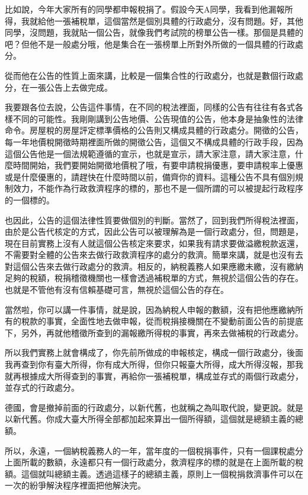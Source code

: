 \documentclass[]{ctexbook}
\begin{document}
比如說，今年大家所有的同學都申報稅捐了。假設今天A同學，我看到他漏報所得，我就給他一張補稅單，這個當然是個別具體的行政處分，沒有問題。好，其他同學，沒問題，我就貼一個公告，就像我們考試院的榜單公告一樣。那個是具體的吧？但他不是一般處分哦，他是集合在一張榜單上所對外所做的一個具體的行政處分。

從而他在公告的性質上面來講，比較是一個集合性的行政處分，也就是數個行政處分，在一張公告上去做完成。

我要跟各位去說，公告這件事情，在不同的稅法裡面，同樣的公告有往往有各式各樣不同的可能性。我剛剛講到公告地價、公告現值的公告，他本身是抽象性的法律命令。房屋稅的房屋評定標準價格的公告則又構成具體的行政處分。開徵的公告，每一年地價稅開徵時期裡面所做的開徵公告，這個又不構成具體的行政手段，因為這個公告他是一個法規範遵循的宣示，也就是宣示，請大家注意，請大家注意，什麼時間開始，我們要開始開徵地價稅了哦，有要申請稅捐優惠，要申請稅率上優惠或是什麼優惠的，請趕快在什麼時間以前，備齊你的資料。這種公告不具有個別規制效力，不能作為行政救濟程序的標的，那也不是一個所謂的可以被提起行政程序的一個標的。

也因此，公告的這個法律性質要做個別的判斷。當然了，回到我們所得稅法裡面，由於是公告代核定的方式，因此公告可以被理解為是一個行政處分，但，問題是，現在目前實務上沒有人就這個公告核定來要求，如果我有請求要做溢繳稅款返還，不需要對全體的公告來去做行政救濟程序的處分的救濟。簡單來講，就是也沒有去對這個公告來去做行政處分的救濟。相反的，納稅義務人如果應繳未繳，沒有繳納足夠的稅額，稅捐稽徵機關也一樣會透過補稅單的方式，無視於這個公告的存在。也就是不管他有沒有信賴基礎可言，無視於這個公告的存在。

當然啦，你可以講一件事情，就是說，因為納稅人申報的數額，沒有把他應繳納所有的稅款的事實，全面性地去做申報，從而稅捐接機關在不變動前面公告的前提底下，另外，再就他稽徵所查到的漏報繳所得稅的事實，再來去做補稅的行政處分。

所以我們實務上就會構成了，你先前所做成的申報核定，構成一個行政處分，後面我再查到你有臺大所得，你有成大所得，但你只報臺大所得，成大所得沒報，那我就再根據成大所得查到的事實，再給你一張補稅單，構成並存式的兩個行政處分，並存式的行政處分。

德國，會是撤掉前面的行政處分，以新代舊，也就稱之為叫取代說，變更說。就是以新代舊。你成大臺大所得全部都加起來算出一個所得額，這個就是總額主義的總額。

所以，永遠，一個納稅義務人的一年，當年度的一個稅捐事件，只有一個課稅處分上面所載的數額，永遠都只有一個行政處分，救濟程序的標的就是在上面所載的稅額。這個就叫總額主義。透過這樣子的總額主義，原則上一個稅捐救濟事件可以在一次的紛爭解決程序裡面把他解決完。
\end{document}
